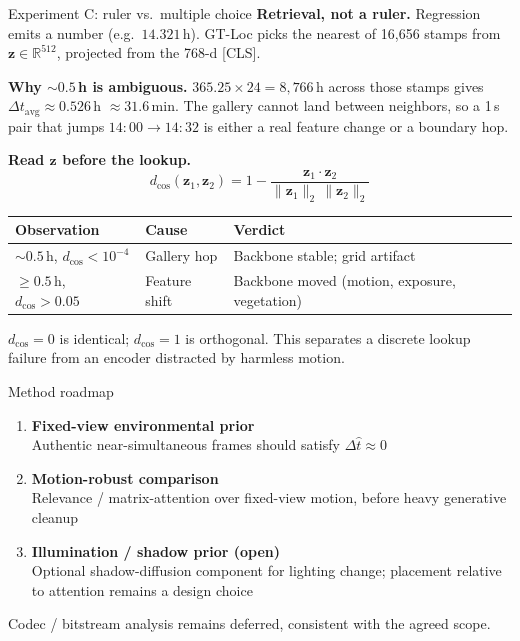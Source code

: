 \documentclass[aspectratio=169,11pt]{beamer}
\begin{document}
\begin{frame}{Experiment C: ruler vs.\ multiple choice}
\small\setlength{\parskip}{0.08em}
\textbf{Retrieval, not a ruler.}
Regression emits a number (e.g.\ $14.321$\,h). GT-Loc picks the nearest of 16{,}656 stamps from $\mathbf{z}\in\mathbb{R}^{512}$, projected from the 768-d [CLS].
\vspace{0.15em}

\textbf{Why $\sim 0.5$\,h is ambiguous.}
$365.25\times 24=8{,}766$\,h across those stamps gives
$\Delta t_{\mathrm{avg}}\approx 0.526$\,h $\approx 31.6$\,min.
The gallery cannot land between neighbors, so a 1\,s pair that jumps $14{:}00\rightarrow 14{:}32$ is either a real feature change or a boundary hop.
\vspace{0.15em}

\textbf{Read $\mathbf{z}$ before the lookup.}
\[
d_{\cos}(\mathbf{z}_1,\mathbf{z}_2)
=1-\frac{\mathbf{z}_1\cdot\mathbf{z}_2}{\lVert\mathbf{z}_1\rVert_2\,\lVert\mathbf{z}_2\rVert_2}
\]
\vspace{-0.7em}
\begin{center}
\footnotesize
\renewcommand{\arraystretch}{1.12}
\begin{tabular}{@{}p{}p{}p{}@{}}
\toprule
\textbf{Observation} & \textbf{Cause} & \textbf{Verdict} \\
\midrule
$\sim 0.5$\,h, $d_{\cos}<10^{-4}$ & Gallery hop & Backbone stable; grid artifact \\
$\ge 0.5$\,h, $d_{\cos}>0.05$ & Feature shift & Backbone moved (motion, exposure, vegetation) \\
\bottomrule
\end{tabular}
\end{center}
\vspace{-0.15em}
{\footnotesize\color{muted}
$d_{\cos}=0$ is identical; $d_{\cos}=1$ is orthogonal.
This separates a discrete lookup failure from an encoder distracted by harmless motion.}
\end{frame}

\begin{frame}{Method roadmap}
\begin{enumerate}
  \item \textbf{Fixed-view environmental prior}\\
        Authentic near-simultaneous frames should satisfy $\Delta\hat{t}\approx 0$
  \item \textbf{Motion-robust comparison}\\
        Relevance / matrix-attention over fixed-view motion, before heavy generative cleanup
  \item \textbf{Illumination / shadow prior (open)}\\
        Optional shadow-diffusion component for lighting change; placement relative to attention remains a design choice
\end{enumerate}
\vspace{0.5em}
Codec / bitstream analysis remains deferred, consistent with the agreed scope.
\end{frame}
\end{document}
